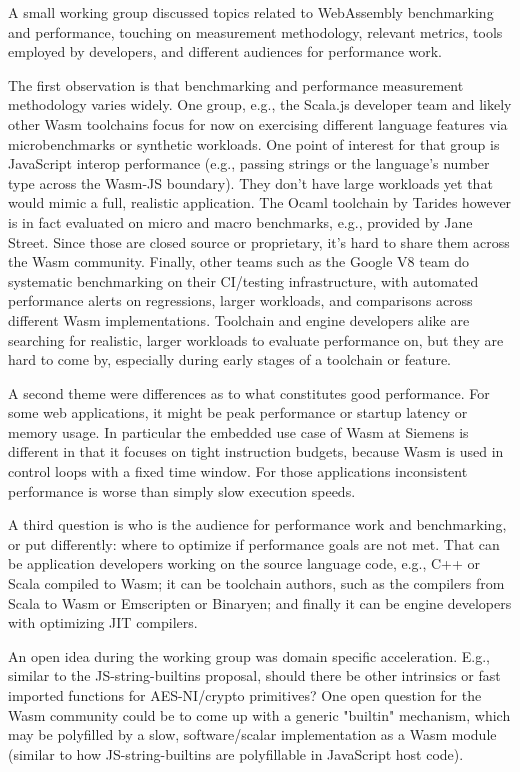 \documentclass[a4paper,UKenglish]{dagrep-v2018}
\begin{document}
\license

A small working group discussed topics related to WebAssembly benchmarking and performance, touching on measurement methodology, relevant metrics, tools employed by developers, and different audiences for performance work.

The first observation is that benchmarking and performance measurement methodology varies widely. One group, e.g., the Scala.js developer team and likely other Wasm toolchains focus for now on exercising different language features via microbenchmarks or synthetic workloads. One point of interest for that group is JavaScript interop performance (e.g., passing strings or the language's number type across the Wasm-JS boundary). They don't have large workloads yet that would mimic a full, realistic application. The Ocaml toolchain by Tarides however is in fact evaluated on micro and macro benchmarks, e.g., provided by Jane Street. Since those are closed source or proprietary, it's hard to share them across the Wasm community. Finally, other teams such as the Google V8 team do systematic benchmarking on their CI/testing infrastructure, with automated performance alerts on regressions, larger workloads, and comparisons across different Wasm implementations. Toolchain and engine developers alike are searching for realistic, larger workloads to evaluate performance on, but they are hard to come by, especially during early stages of a toolchain or feature.

A second theme were differences as to what constitutes good performance. For some web applications, it might be peak performance or startup latency or memory usage. In particular the embedded use case of Wasm at Siemens is different in that it focuses on tight instruction budgets, because Wasm is used in control loops with a fixed time window. For those applications inconsistent performance is worse than simply slow execution speeds.

A third question is who is the audience for performance work and benchmarking, or put differently: where to optimize if performance goals are not met. That can be application developers working on the source language code, e.g., C++ or Scala compiled to Wasm; it can be toolchain authors, such as the compilers from Scala to Wasm or Emscripten or Binaryen; and finally it can be engine developers with optimizing JIT compilers.

An open idea during the working group was domain specific acceleration. E.g., similar to the JS-string-builtins proposal, should there be other intrinsics or fast imported functions for AES-NI/crypto primitives? One open question for the Wasm community could be to come up with a generic "builtin" mechanism, which may be polyfilled by a slow, software/scalar implementation as a Wasm module (similar to how JS-string-builtins are polyfillable in JavaScript host code).
\end{document}
